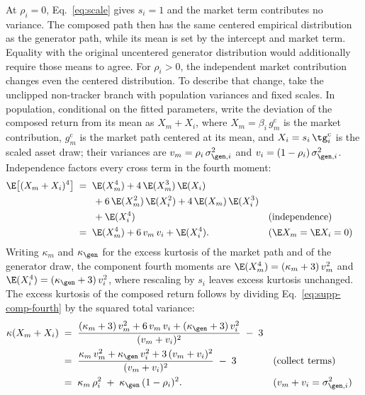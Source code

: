 At $\rho_i = 0$, Eq.~\eqref{eq:scale} gives $s_i = 1$ and the market
term contributes no variance. The composed path then has the same
centered empirical distribution as the generator path, while its mean
is set by the intercept and market term. Equality with the original
uncentered generator distribution would additionally require those
means to agree. For $\rho_i > 0$, the independent market contribution
changes even the centered distribution. To describe that change, take
the unclipped non-tracker branch with population variances and fixed
scales. In population, conditional on the fitted parameters,
write the deviation of the composed return from its mean as
$X_m + X_i$, where $X_m = \beta_i\, g_m^{\mathrm c}$ is the market
contribution, $g_m^{\mathrm c}$ is the market path centered at its
mean, and $X_i = s_i\, \tg_i^{\mathrm c}$ is the scaled asset draw;
their variances are $v_m = \rho_i\, \sigma_{\gen,i}^2$ and
$v_i = (1 - \rho_i)\, \sigma_{\gen,i}^2$. Independence factors every
cross term in the fourth moment:
\begin{align}
  \E\big[(X_m + X_i)^4\big]
   &\;=\; \E(X_m^4) + 4\,\E(X_m^3)\,\E(X_i)
     \notag \\
   &\qquad + 6\,\E(X_m^2)\,\E(X_i^2)
     + 4\,\E(X_m)\,\E(X_i^3)
     \notag \\
   &\qquad + \E(X_i^4)
     && \text{(independence)} \notag \\
   &\;=\; \E(X_m^4) + 6\, v_m\, v_i + \E(X_i^4).
     && \text{($\E X_m = \E X_i = 0$)}
  \label{eq:supp-comp-fourth}
\end{align}
Writing $\kappa_m$ and $\kappa_{\gen}$ for the excess kurtosis of the
market path and of the generator draw, the component fourth moments
are $\E(X_m^4) = (\kappa_m + 3)\, v_m^2$ and
$\E(X_i^4) = (\kappa_{\gen} + 3)\, v_i^2$, where rescaling by $s_i$
leaves excess kurtosis unchanged. The excess kurtosis of the composed
return follows by dividing Eq.~\eqref{eq:supp-comp-fourth} by the
squared total variance:
\begin{align}
  \kappa(X_m + X_i)
   &\;=\; \frac{(\kappa_m + 3)\, v_m^2 + 6\, v_m\, v_i
     + (\kappa_{\gen} + 3)\, v_i^2}{(v_m + v_i)^2} \;-\; 3
     \notag \\
   &\;=\; \frac{\kappa_m\, v_m^2 + \kappa_{\gen}\, v_i^2
     + 3\, (v_m + v_i)^2}{(v_m + v_i)^2} \;-\; 3
     && \text{(collect terms)} \notag \\
   &\;=\; \kappa_m\, \rho_i^2 \;+\; \kappa_{\gen}\, (1 - \rho_i)^2.
     && \text{($v_m + v_i = \sigma_{\gen,i}^2$)}
  \label{eq:supp-kurt-comp}
\end{align}
